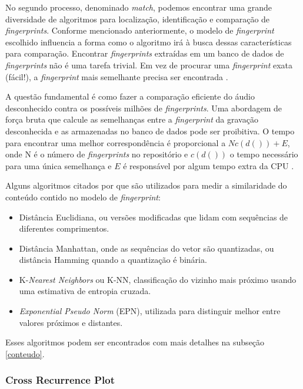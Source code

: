 No segundo processo, denominado \textit{match}, podemos encontrar uma grande diversidade de algoritmos para localização, identificação e comparação de \textit{fingerprints}. Conforme mencionado anteriormente, o modelo de \textit{fingerprint} escolhido influencia a forma como o algoritmo irá à busca dessas características para comparação. Encontrar \textit{fingerprints} extraídas em um banco de dados de \textit{fingerprints} não é uma tarefa trivial. Em vez de procurar uma \textit{fingerprint} exata (fácil!), a \textit{fingerprint} mais semelhante precisa ser encontrada \cite{haitsma2002}.

A questão fundamental é como fazer a comparação eficiente do áudio desconhecido contra os possíveis milhões de \textit{fingerprints}. Uma abordagem de força bruta que calcule as semelhanças entre a \textit{fingerprint} da gravação desconhecida e as armazenadas no banco de dados pode ser proibitiva. O tempo para encontrar uma melhor correspondência é proporcional a \({N c(d()) + E}\), onde N é o número de \textit{fingerprints} no repositório e \({c(d())}\) o tempo necessário para uma única semelhança e \({E}\) é responsável por algum tempo extra da CPU \cite{cano2005}.

Alguns algoritmos citados por  que são utilizados para medir a similaridade do conteúdo contido no modelo de \textit{fingerprint}:

\begin{itemize}
    \item Distância Euclidiana, ou versões modificadas que lidam com sequências de diferentes comprimentos.
    \item Distância Manhattan, onde as sequências do vetor são quantizadas, ou distância Hamming quando a quantização é binária.
    \item K-\textit{Nearest Neighbors} ou K-NN, classificação do vizinho mais próximo usando uma estimativa de entropia cruzada.
    \item \textit{Exponential Pseudo Norm} (EPN), utilizada para distinguir melhor entre valores próximos e distantes.
\end{itemize}

Esses algoritmos podem ser encontrados com mais detalhes na subseção \ref{conteudo}.

\subsubsection{Cross Recurrence Plot}

